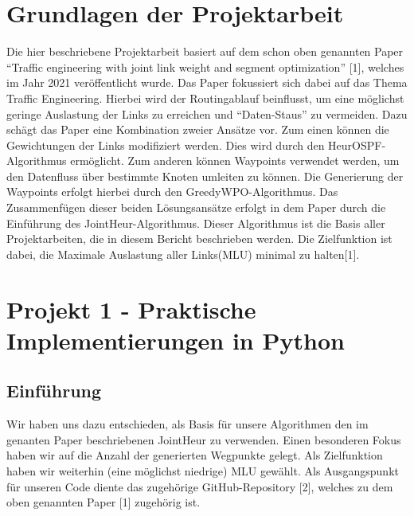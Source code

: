 \documentclass[sigconf,noacm,review]{acmart}
\begin{document}
\section{Grundlagen der Projektarbeit}
Die hier beschriebene Projektarbeit basiert auf dem schon oben genannten 
Paper ``Traffic engineering with joint link weight and segment optimization'' [1], welches im
Jahr 2021 veröffentlicht wurde. Das Paper fokussiert sich dabei auf das Thema Traffic Engineering.
Hierbei wird der Routingablauf beinflusst, um eine möglichst geringe Auslastung der Links zu
erreichen und ``Daten-Staus'' zu vermeiden. Dazu schägt das Paper eine Kombination zweier Ansätze vor.
Zum einen können die Gewichtungen der Links modifiziert werden. Dies wird durch den HeurOSPF-Algorithmus ermöglicht. Zum anderen können Waypoints 
verwendet werden, um den Datenfluss über bestimmte Knoten umleiten zu können. Die Generierung der Waypoints erfolgt hierbei durch den 
GreedyWPO-Algorithmus. Das Zusammenfügen dieser beiden Lösungsansätze
erfolgt in dem Paper durch die Einführung des JointHeur-Algorithmus. Dieser Algorithmus ist die Basis aller Projektarbeiten,
die in diesem Bericht beschrieben werden. Die Zielfunktion ist dabei,
die Maximale Auslastung aller Links(MLU) minimal zu halten[1].

\section{Projekt 1 - Praktische Implementierungen in Python}
\subsection{Einführung}
Wir haben uns dazu entschieden, als Basis für unsere Algorithmen den im genanten Paper beschriebenen JointHeur 
zu verwenden. Einen besonderen Fokus haben wir auf die Anzahl der generierten Wegpunkte gelegt. 
Als Zielfunktion haben wir weiterhin (eine möglichst niedrige) MLU gewählt. Als Ausgangspunkt für unseren Code diente das zugehörige GitHub-Repository [2], welches 
zu dem oben genannten Paper [1] zugehörig ist.
\end{document}
